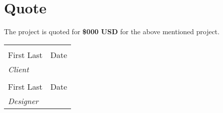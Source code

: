 \documentclass[12pt]{article} %
\begin{document}
\section*{Quote}

The project is quoted for \textbf{\$000 USD} for the above mentioned project.

\bigskip
\bigskip

\noindent
\begin{tabular}{@{}p{2.5in}p{2.5in}@{}}
  \hrulefill & \hrulefill \\
  First Last & Date \\ \textit{Client} \\[5\medskipamount]

  \hrulefill & \hrulefill \\
  First Last & Date \\
  \textit{Designer}
  \end{tabular}
\end{document}

